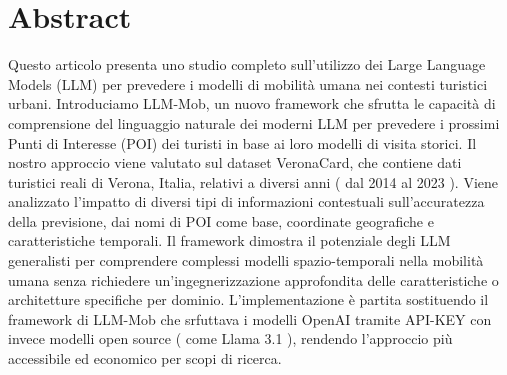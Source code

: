 \chapter*{Abstract}
Questo articolo presenta uno studio completo sull'utilizzo dei Large Language Models (LLM) per prevedere i modelli di mobilità umana nei contesti turistici urbani. Introduciamo LLM-Mob, un nuovo framework che sfrutta le capacità di comprensione del linguaggio naturale dei moderni LLM per prevedere i prossimi Punti di Interesse (POI) dei turisti in base ai loro modelli di visita storici. Il nostro approccio viene valutato sul dataset VeronaCard, che contiene dati turistici reali di Verona, Italia, relativi a diversi anni ( dal 2014 al 2023 ). Viene analizzato l'impatto di diversi tipi di informazioni contestuali sull'accuratezza della previsione, dai nomi di POI come base, coordinate geografiche e caratteristiche temporali. Il framework dimostra il potenziale degli LLM generalisti per comprendere complessi modelli spazio-temporali nella mobilità umana senza richiedere un'ingegnerizzazione approfondita delle caratteristiche o architetture specifiche per dominio. L'implementazione è partita sostituendo il framework di LLM-Mob che srfuttava i modelli OpenAI tramite API-KEY con invece modelli open source ( come Llama 3.1 ), rendendo l'approccio più accessibile ed economico per scopi di ricerca.